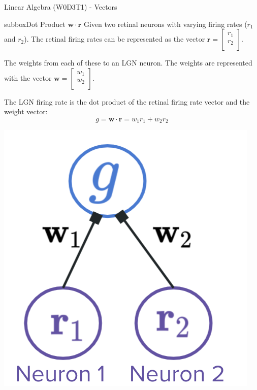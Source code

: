 \begin{textbox}{Linear Algebra (W0D3T1) - Vectors}
\begin{subbox}{subbox}{Dot Product $\mathbf{w}\cdot\mathbf{r}$}
\scriptsize
Given two retinal neurons with varying firing rates ($r_1$ and $r_2$).  The retinal firing rates can be represented as the vector $\mathbf{r} = \begin{bmatrix} r_1\\ r_2\\ \end{bmatrix}$.

The weights from each of these to an LGN neuron. The weights are represented with the vector $\mathbf{w} = \begin{bmatrix} w_1\\ w_2\\ \end{bmatrix}$.

The LGN firing rate is the dot product of the retinal firing rate vector and the weight vector:
\begin{equation}
g = \mathbf{w}\cdot\mathbf{r} = w_1r_1 + w_2r_2
\end{equation}

\centering
\includegraphics[scale=0.3]{Figures/PreCourse/Figure2.png}
\end{subbox}

\end{textbox}
